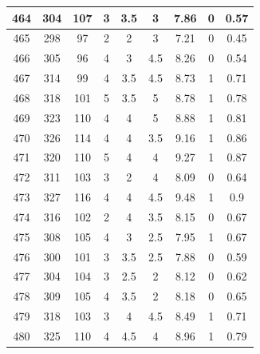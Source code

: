 \documentclass[11pt]{article}
\begin{document}
\begin{appendix}
\begin{longtable}[H]{|c|c|c|c|c|c|c|c|c|}
	464        & 304       & 107         & 3                 & 3.5 & 3   & 7.86 & 0        & 0.57            \\ \hline
	465        & 298       & 97          & 2                 & 2   & 3   & 7.21 & 0        & 0.45            \\ \hline
	466        & 305       & 96          & 4                 & 3   & 4.5 & 8.26 & 0        & 0.54            \\ \hline
	467        & 314       & 99          & 4                 & 3.5 & 4.5 & 8.73 & 1        & 0.71            \\ \hline
	468        & 318       & 101         & 5                 & 3.5 & 5   & 8.78 & 1        & 0.78            \\ \hline
	469        & 323       & 110         & 4                 & 4   & 5   & 8.88 & 1        & 0.81            \\ \hline
	470        & 326       & 114         & 4                 & 4   & 3.5 & 9.16 & 1        & 0.86            \\ \hline
	471        & 320       & 110         & 5                 & 4   & 4   & 9.27 & 1        & 0.87            \\ \hline
	472        & 311       & 103         & 3                 & 2   & 4   & 8.09 & 0        & 0.64            \\ \hline
	473        & 327       & 116         & 4                 & 4   & 4.5 & 9.48 & 1        & 0.9             \\ \hline
	474        & 316       & 102         & 2                 & 4   & 3.5 & 8.15 & 0        & 0.67            \\ \hline
	475        & 308       & 105         & 4                 & 3   & 2.5 & 7.95 & 1        & 0.67            \\ \hline
	476        & 300       & 101         & 3                 & 3.5 & 2.5 & 7.88 & 0        & 0.59            \\ \hline
	477        & 304       & 104         & 3                 & 2.5 & 2   & 8.12 & 0        & 0.62            \\ \hline
	478        & 309       & 105         & 4                 & 3.5 & 2   & 8.18 & 0        & 0.65            \\ \hline
	479        & 318       & 103         & 3                 & 4   & 4.5 & 8.49 & 1        & 0.71            \\ \hline
	480        & 325       & 110         & 4                 & 4.5 & 4   & 8.96 & 1        & 0.79            \\ \hline

\end{longtable}
\end{appendix}
\end{document}

